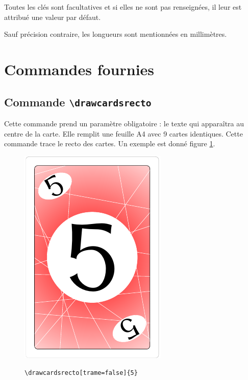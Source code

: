 \documentclass[a4paper, 12pt]{article}
\newcommand{\commande}[1]{\texttt{\textbackslash#1}}
\begin{document}
Toutes les clés sont facultatives et si elles ne sont pas renseignées, il leur est attribué une valeur par défaut.

Sauf précision contraire, les longueurs sont mentionnées en millimètres.

\section{Commandes fournies}
	\subsection{Commande \commande{drawcardsrecto}}
Cette commande prend un paramètre obligatoire : le texte qui apparaîtra au centre de la carte. Elle remplit une feuille A4 avec 9 cartes identiques. Cette commande trace le recto des cartes. Un exemple est donné figure \ref{fig:recto}.
\begin{figure}[h]\begin{center}
	\caption{\commande{drawcardsrecto[trame=false]\{5\}}}
	\includegraphics{screen01.png}\label{fig:recto}
\end{center}\end{figure}
\end{document}
